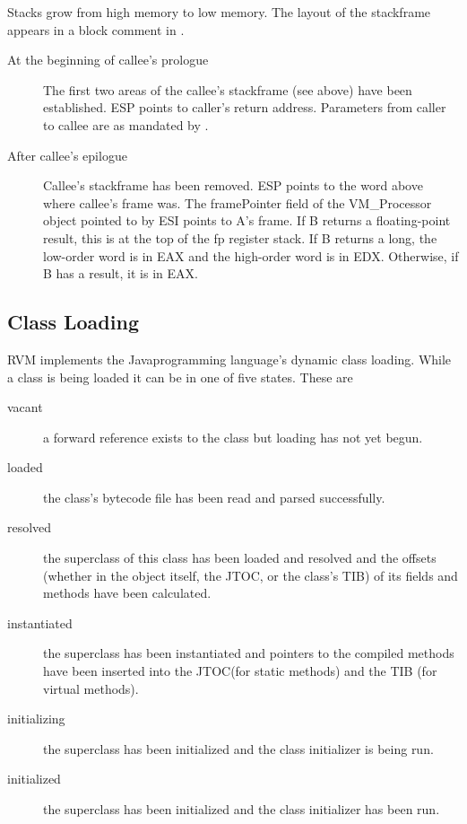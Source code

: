 
Stacks grow from high memory to low memory.
The layout of the stackframe appears in a block comment in
{\LintelStackframeLayoutURL}.


\begin{description}
\item[At the beginning of callee's prologue]
The first two areas of the callee's stackframe (see above) have been
     established.  ESP points to caller's return address.
     Parameters from caller to callee are as mandated by 
{\LintelRegisterConstantsURL}.
\item[After callee's epilogue]
     Callee's stackframe has been removed.  ESP points to the word above where
     callee's frame was.  The framePointer field
     of the VM\_Processor object pointed to by ESI points to A's
     frame.  If B returns a floating-point result, this is at
     the top of the fp register stack.  If B returns a long, the
     low-order word is in EAX and the high-order word is in EDX.
     Otherwise, if B has a result, it is in EAX.

\end{description}

\JavaTMFooter

\AIXTMFooter

\PowerPCTMFooter

\subsection{Class Loading} \label{sssec:classLoading}

RVM implements the Java\trademark programming language's dynamic class
loading. While a class is being loaded it 
can be in one of five states. These are
\begin{description}
\item[vacant] a forward reference exists to the class but loading has not yet 
begun.
\item[loaded] the class's bytecode file has been read and parsed successfully.
\item[resolved] the superclass of this class has been loaded and resolved and
the offsets (whether in the object itself, the JTOC, or the class's TIB) of its 
fields and methods have been calculated.
\item[instantiated] the superclass has been instantiated and pointers to the
compiled methods have been inserted into the JTOC(for static methods) and the
TIB (for virtual methods).
\item[initializing] the superclass has been initialized and the class
initializer is being run.
\item[initialized] the superclass has been initialized and the class
initializer has been run.
\end{description}

